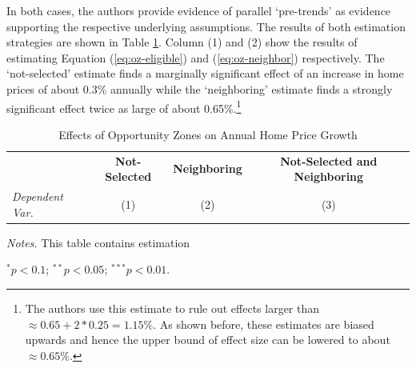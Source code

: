 \documentclass[11pt]{article}
\begin{document}
In both cases, the authors provide evidence of parallel `pre-trends' as evidence supporting the respective underlying assumptions. The results of both estimation strategies are shown in Table \ref{tab:oz}. Column (1) and (2) show the results of estimating Equation (\ref{eq:oz-eligible}) and (\ref{eq:oz-neighbor}) respectively. The `not-selected' estimate finds a marginally significant effect of an increase in home prices of about 0.3\% annually while the `neighboring' estimate finds a strongly significant effect twice as large of about 0.65\%.\footnote{The authors use this estimate to rule out effects larger than $\approx 0.65 + 2 * 0.25 = 1.15\%$. As shown before, these estimates are biased upwards and hence the upper bound of effect size can be lowered to about $\approx 0.65\%$.} 

\begin{table}[!tb]
    \caption{Effects of Opportunity Zones on Annual Home Price Growth}
    \label{tab:oz}
    \renewcommand{\arraystretch}{1.1}

    \begin{adjustbox}{width = 0.8\textwidth, center}
        \begin{threeparttable}
            \begin{tabular}{@{} l ccc @{}}
                \toprule

                & \multicolumn{1}{c}{\textbf{Not-Selected}} & \multicolumn{1}{c}{\textbf{Neighboring}} & \multicolumn{1}{c}{\textbf{Not-Selected and Neighboring}} \\ 
                \textit{Dependent Var.} & (1) & (2) & (3) \\
                
 
                \midrule
                
                

                \bottomrule
            \end{tabular}
            
            \begin{tablenotes}\footnotesize
                \item \textit{Notes.} This table contains estimation 
                \item $^{*} p< 0.1$; $^{**} p < 0.05$; $^{***} p < 0.01$.
            \end{tablenotes}
        \end{threeparttable}
    \end{adjustbox}
\end{table}
\end{document}
